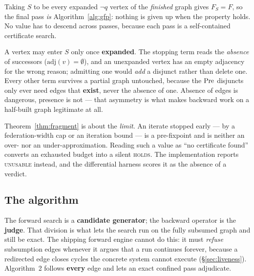 Taking $S$ to be every expanded $\lnot q$ vertex of the \emph{finished} graph gives $F_S = F$, so
the final pass \emph{is} Algorithm~\ref{alg:gfp}: nothing is given up when the property holds. No
value has to descend across passes, because each pass is a self-contained certificate search.

\begin{remark}
\label{rem:expanded}
A vertex may enter $S$ only once \textbf{expanded}. The stopping term reads the \emph{absence} of
successors ($\mathrm{adj}(v) = \emptyset$), and an unexpanded vertex has an empty adjacency for the
wrong reason; admitting one would \emph{add} a disjunct rather than delete one. Every other term
survives a partial graph untouched, because the $\mathrm{Pre}$ disjuncts only ever need edges that
\textbf{exist}, never the absence of one. Absence of edges is dangerous, presence is not --- that
asymmetry is what makes backward work on a half-built graph legitimate at all.
\end{remark}

\begin{remark}
\label{rem:capped}
Theorem~\ref{thm:fragment} is about the \emph{limit}. An iterate stopped early --- by a
federation-width cap or an iteration bound --- is a pre-fixpoint and is neither an over- nor an
under-approximation. Reading such a value as ``no certificate found'' converts an exhausted budget
into a silent \textsc{holds}. The implementation reports \textsc{unusable} instead, and the
differential harness scores it as the absence of a verdict.
\end{remark}

\subsection{The algorithm}
\label{sec:otf:alg}

The forward search is a \textbf{candidate generator}; the backward operator is the \textbf{judge}.
That division is what lets the search run on the fully subsumed graph and still be exact. The
shipping forward engine cannot do this: it must \emph{refuse} subsumption edges whenever it argues
that a run continues forever, because a redirected edge closes cycles the concrete system cannot
execute (\S\ref{sec:liveness}). Algorithm~2 follows \textbf{every} edge and lets an exact confined
pass adjudicate.


